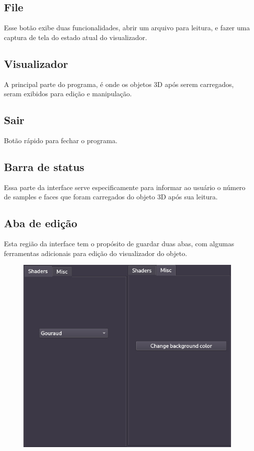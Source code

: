 \documentclass{ol-softwaremanual}
\begin{document}
\subsection{File}

Esse botão exibe duas funcionalidades, abrir um arquivo para 
leitura, e fazer uma captura de tela do estado atual do visualizador. 

\subsection{Visualizador}

A principal parte do programa, é onde os objetos 3D após 
serem carregados, seram exibidos para edição e manipulação.

\subsection{Sair}

Botão rápido para fechar o programa.

\subsection{Barra de status}

Essa parte da interface serve especificamente para 
informar ao usuário o número de samples e faces que foram 
carregados do objeto 3D após sua leitura.

\subsection{Aba de edição}

Esta região da interface tem o propósito de guardar 
duas abas, com algumas ferramentas adicionais para edição 
do visualizador do objeto. 

\begin{figure}[ht]
    \centering
    \includegraphics[scale=0.3]{abadeedicao.jpg}
\end{figure}
\end{document}
